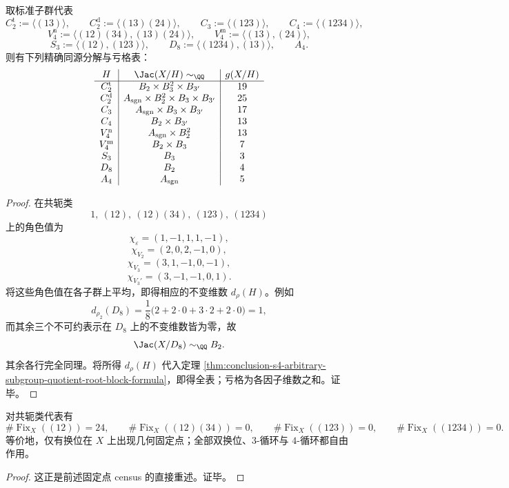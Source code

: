 \begin{theorem}\label{thm:conclusion-s4-standard-subgroup-rootblock-atlas}
取标准子群代表
\[
C_2^{\mathrm t}:=\langle(13)\rangle,\qquad
C_2^{\mathrm d}:=\langle(13)(24)\rangle,\qquad
C_3:=\langle(123)\rangle,\qquad
C_4:=\langle(1234)\rangle,
\]
\[
V_4^{\mathrm n}:=\langle(12)(34),(13)(24)\rangle,\qquad
V_4^{\mathrm m}:=\langle(13),(24)\rangle,
\]
\[
S_3:=\langle(12),(123)\rangle,\qquad
D_8:=\langle(1234),(13)\rangle,\qquad
A_4.
\]
则有下列精确同源分解与亏格表：
\[
\begin{array}{c|c|c}
H & \Jac(X/H)\sim_{\QQ} & g(X/H)\\
\hline
C_2^{\mathrm t} & B_2\times B_3^{2}\times B_{3'} & 19\\
C_2^{\mathrm d} & A_{\mathrm{sgn}}\times B_2^{2}\times B_3\times B_{3'} & 25\\
C_3 & A_{\mathrm{sgn}}\times B_3\times B_{3'} & 17\\
C_4 & B_2\times B_{3'} & 13\\
V_4^{\mathrm n} & A_{\mathrm{sgn}}\times B_2^{2} & 13\\
V_4^{\mathrm m} & B_2\times B_3 & 7\\
S_3 & B_3 & 3\\
D_8 & B_2 & 4\\
A_4 & A_{\mathrm{sgn}} & 5
\end{array}
\]
\end{theorem}
\begin{proof}
在共轭类
\[
1,\ (12),\ (12)(34),\ (123),\ (1234)
\]
上的角色值为
\[
\chi_{\varepsilon}=(1,-1,1,1,-1),
\]
\[
\chi_{V_2}=(2,0,2,-1,0),
\]
\[
\chi_{V_3}=(3,1,-1,0,-1),
\]
\[
\chi_{V_3'}=(3,-1,-1,0,1).
\]
将这些角色值在各子群上平均，即得相应的不变维数 \(d_\rho(H)\)。例如
\[
d_{\rho_2}(D_8)=\frac18\bigl(2+2\cdot 0+3\cdot 2+2\cdot 0\bigr)=1,
\]
而其余三个不可约表示在 \(D_8\) 上的不变维数皆为零，故
\[
\Jac(X/D_8)\sim_{\QQ}B_2.
\]
其余各行完全同理。将所得 \(d_\rho(H)\) 代入定理 \ref{thm:conclusion-s4-arbitrary-subgroup-quotient-root-block-formula}，即得全表；亏格为各因子维数之和。证毕。
\end{proof}

\begin{proposition}\label{prop:conclusion-s4-fixedpoint-census-repackaged}
对共轭类代表有
\[
\#\operatorname{Fix}_X((12))=24,\qquad
\#\operatorname{Fix}_X((12)(34))=0,\qquad
\#\operatorname{Fix}_X((123))=0,\qquad
\#\operatorname{Fix}_X((1234))=0.
\]
等价地，仅有换位在 \(X\) 上出现几何固定点；全部双换位、\(3\)-循环与 \(4\)-循环都自由作用。
\end{proposition}
\begin{proof}
这正是前述固定点 census 的直接重述。证毕。
\end{proof}

